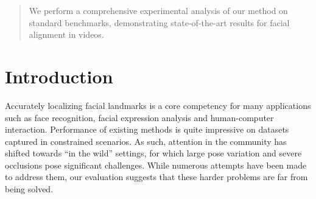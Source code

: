 \documentclass[letterpaper]{article} %
\begin{document}
\begin{abstract}
 We perform a comprehensive experimental analysis of our method on standard benchmarks, demonstrating state-of-the-art results for facial alignment in videos.
\end{abstract}

\section{Introduction}
\setcounter{secnumdepth}{2}

Accurately localizing facial landmarks is a core competency for many applications such as face recognition, facial expression analysis and human-computer interaction. 
Performance of existing methods is quite impressive on datasets captured in constrained scenarios. As such, attention in the community has shifted towards ``in the wild'' \cite{Sagonas2016300FI} %
settings, for which large pose variation and severe occlusions pose significant challenges. While numerous attempts have been made to address them,
our evaluation suggests that these harder problems are far from being solved.
\end{document}

